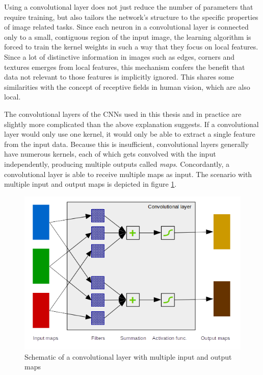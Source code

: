 \documentclass[11pt, a4paper]{article}
\begin{document}
Using a convolutional layer does not just reduce the number of parameters that require training, but also tailors the network's structure to the specific properties of image related tasks. Since each neuron in a convolutional layer is connected only to a small, contiguous region of the input image, the learning algorithm is forced to train the kernel weights in such a way that they focus on local features. Since a lot of distinctive information in images such as edges, corners and textures emerges from local features, this mechanism confers the benefit that data not relevant to those features is implicitly ignored. This shares some similarities with the concept of receptive fields in human vision, which are also local.

The convolutional layers of the CNNs used in this thesis and in practice are slightly more complicated than the above explanation suggests. If a convolutional layer would only use one kernel, it would only be able to extract a single feature from the input data. Because this is insufficient, convolutional layers generally have numerous kernels, each of which gets convolved with the input independently, producing multiple outputs called \emph{maps}. Concordantly, a convolutional layer is able to receive multiple maps as input. The scenario with multiple input and output maps is depicted in figure \ref{fig:convolutional-layer-maps}.

\begin{figure}[htp]
	\centering
	\includegraphics[scale=1.00]{images/convolution_layer_maps.png}
	\caption{Schematic of a convolutional layer with multiple input and output maps}
	\label{fig:convolutional-layer-maps}
\end{figure}
\end{document}
